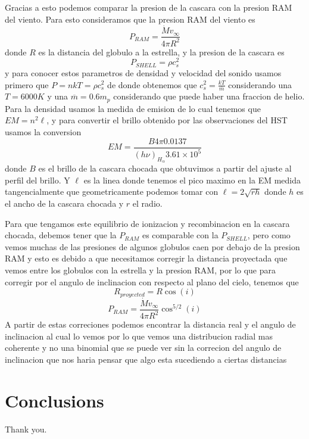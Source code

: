 \documentclass[twocolumn, times]{aastex631}
\begin{document}
Gracias a esto podemos comparar la presion de la cascara con la presion RAM del viento. Para esto consideramos que la presion RAM del viento es 
\[P_{RAM}=\frac{\dot{M}v_\infty}{4\pi R^2}\]
donde $R$ es la distancia del globulo a la estrella, y la presion de la cascara es 
\[P_{SHELL}=\rho c_s^2\] 
y para conocer estos parametros de densidad y velocidad del sonido usamos primero que $P=nkT=\rho c_s^2$ de donde obtenemos que $c_s^2=\frac{k T}{\overline{m}}$ considerando una $T=6000 K$ y una $\overline{m}=0.6m_p$ considerando que puede haber una fraccion de helio.
Para la densidad usamos la medida de emision de lo cual tenemos que $EM=n^2\ell$, y para convertir el brillo obtenido por las observaciones del HST usamos la conversion 
\[EM=\frac{B 4\pi 0.0137}{(h\nu)_{H_\alpha}3.61\times10^5}\]
donde $B$ es el brillo de la cascara chocada que obtuvimos a partir del ajuste al perfil del brillo. Y $\ell$ es la linea donde tenemos el pico maximo en la EM medida tangencialmente que geometricamente podemos tomar con $\ell=2\sqrt{r h}$ donde $h$ es el ancho de la cascara chocada y $r$ el radio.

Para que tengamos este equilibrio de ionizacion y recombinacion en la cascara chocada, debemos tener que la $P_{RAM}$ es comparable con la $P_{SHELL}$, pero como vemos muchas de las presiones de algunos globulos caen por debajo de la presion RAM y esto es debido a que necesitamos corregir la distancia proyectada que vemos entre los globulos con la estrella y la presion RAM, por lo que para corregir por el angulo de inclinacion con respecto al plano del cielo, tenemos que
\[R_{proyected}=R \cos(i)\]
\[P_{RAM}=\frac{\dot{M}v_\infty}{4\pi R^2}\cos^{5/2}(i)\]
A partir de estas correciones podemos encontrar la distancia real y el angulo de inclinacion al cual lo vemos por lo que vemos una distribucion radial mas coherente y no una binomial que se puede ver sin la correcion del angulo de inclinacion que nos haria pensar que algo esta sucediendo a ciertas distancias

\section{Conclusions}
\label{sec:conclusions}

\begin{acknowledgments}
  Thank you.
\end{acknowledgments}



\end{document}
